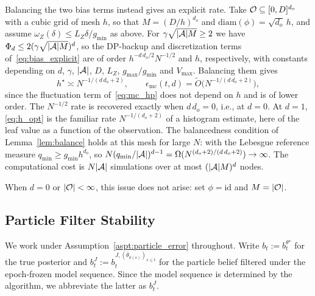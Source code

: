 \begin{rmk}
Balancing the two bias terms instead gives an explicit rate.
Take ${\mathcal{O}}\subseteq[0,D]^{d_o}$ with a cubic grid of mesh $h$, so that $M=(D/h)^{d_o}$ and $\mathrm{diam}(\phi)=\sqrt{d_o}\,h$, and assume $\omega_Z(\delta)\le L_Z\delta/g_{\min}$ as above.
For $\gamma\sqrt{|{\mathcal{A}}|M}\ge2$ we have $\Phi_d\le2(\gamma\sqrt{|{\mathcal{A}}|M})^d$, so the DP-backup and discretization terms of~\eqref{eq:bias_explicit} are of order $h^{-d\,d_o/2}N^{-1/2}$ and $h$, respectively, with constants depending on $d$, $\gamma$, $|{\mathcal{A}}|$, $D$, $L_Z$, $g_{\max}/g_{\min}$ and $V_{\max}$.
Balancing them gives
\begin{equation}\label{eq:h_opt}
h^\star\asymp N^{-1/(d\,d_o+2)},\qquad \epsilon_{\mathrm{mc}}(t,d)=\widetilde O\bigl(N^{-1/(d\,d_o+2)}\bigr),
\end{equation}
since the fluctuation term of~\eqref{eq:mc_hp} does not depend on $h$ and is of lower order.
The $N^{-1/2}$ rate is recovered exactly when $d\,d_o=0$, i.e., at $d=0$.
At $d=1$, \eqref{eq:h_opt} is the familiar rate $N^{-1/(d_o+2)}$ of a histogram estimate, here of the leaf value as a function of the observation.
The balancedness condition of Lemma~\ref{lem:balance} holds at this mesh for large $N$: with the Lebesgue reference measure $q_{\min}\ge g_{\min}h^{d_o}$, so $N(q_{\min}/|{\mathcal{A}}|)^{d-1}=\Omega(N^{(d_o+2)/(d\,d_o+2)})\to\infty$.
The computational cost is $N|{\mathcal{A}}|$ simulations over at most $(|{\mathcal{A}}|M)^d$ nodes.

When $d=0$ or $|{\mathcal{O}}|<\infty$, this issue does not arise: set $\phi=\mathrm{id}$ and $M=|{\mathcal{O}}|$.
\end{rmk}



\subsection{Particle Filter Stability}
\label{app:pf_proof}

We work under Assumption~\ref{aspt:particle_error} throughout. Write $b_t:=b_t^{\theta^\star}$ for the true posterior and $b_t^J:=b_t^{J,(\bar\theta_{k(s)})_{s\le t}}$ for the particle belief filtered under the epoch-frozen model sequence. Since the model sequence is determined by the algorithm, we abbreviate the latter as $b_t^J$.

